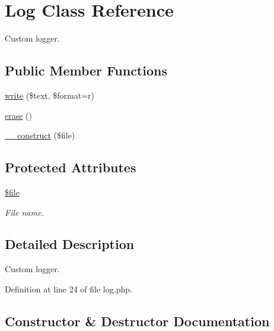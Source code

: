 \hypertarget{class_log}{}\section{Log Class Reference}
\label{class_log}


Custom logger.  


\subsection*{Public Member Functions}
\begin{DoxyCompactItemize}
\item 
\hyperlink{class_log_a41c34766cae727baba674b38abfdcf9c}{write} (\$text, \$format=\textquotesingle{}r\textquotesingle{})
\item 
\hyperlink{class_log_a933f3fa1037c8b797bdd237d811edf82}{erase} ()
\item 
\hyperlink{class_log_a8ef77288a5f940c68ebc57fdf0102078}{\+\_\+\+\_\+construct} (\$file)
\end{DoxyCompactItemize}
\subsection*{Protected Attributes}
\begin{DoxyCompactItemize}
\item 
\hypertarget{class_log_aa1bfbd27060176201b271918dff57e8f}{}\label{class_log_aa1bfbd27060176201b271918dff57e8f} 
\hyperlink{class_log_aa1bfbd27060176201b271918dff57e8f}{\$file}
\begin{DoxyCompactList}\small\item\em File name. \end{DoxyCompactList}\end{DoxyCompactItemize}


\subsection{Detailed Description}
Custom logger. 

Definition at line 24 of file log.\+php.



\subsection{Constructor \& Destructor Documentation}
\hypertarget{class_log_a8ef77288a5f940c68ebc57fdf0102078}{}\label{class_log_a8ef77288a5f940c68ebc57fdf0102078} 
